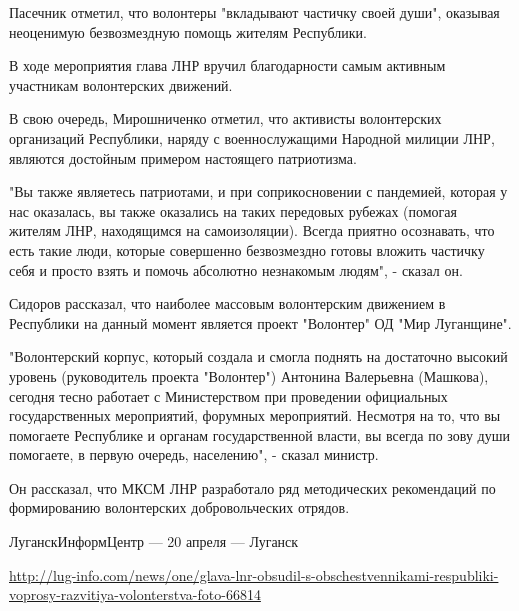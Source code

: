 Пасечник отметил, что волонтеры "вкладывают частичку своей души", оказывая
неоценимую безвозмездную помощь жителям Республики.

В ходе мероприятия глава ЛНР вручил благодарности самым активным участникам
волонтерских движений.

В свою очередь, Мирошниченко отметил, что активисты волонтерских организаций
Республики, наряду с военнослужащими Народной милиции ЛНР, являются достойным
примером настоящего патриотизма.

"Вы также являетесь патриотами, и при соприкосновении с пандемией, которая у
нас оказалась, вы также оказались на таких передовых рубежах (помогая жителям
ЛНР, находящимся на самоизоляции). Всегда приятно осознавать, что есть такие
люди, которые совершенно безвозмездно готовы вложить частичку себя и просто
взять и помочь абсолютно незнакомым людям", - сказал он.

Сидоров рассказал, что наиболее массовым волонтерским движением в Республики на
данный момент является проект "Волонтер" ОД "Мир Луганщине".

"Волонтерский корпус, который создала и смогла поднять на достаточно высокий
уровень (руководитель проекта "Волонтер") Антонина Валерьевна (Машкова),
сегодня тесно работает с Министерством при проведении официальных
государственных мероприятий, форумных мероприятий. Несмотря на то, что вы
помогаете Республике и органам государственной власти, вы всегда по зову души
помогаете, в первую очередь, населению", - сказал министр.

Он рассказал, что МКСМ ЛНР разработало ряд методических рекомендаций по
формированию волонтерских добровольческих отрядов.

ЛуганскИнформЦентр — 20 апреля — Луганск

\url{http://lug-info.com/news/one/glava-lnr-obsudil-s-obschestvennikami-respubliki-voprosy-razvitiya-volonterstva-foto-66814}

